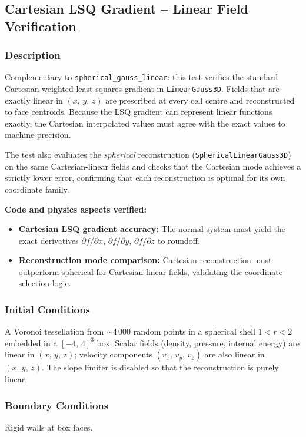 \documentclass[11pt,a4paper]{article}
\begin{document}
\newpage

\subsection{Cartesian LSQ Gradient -- Linear Field Verification}
\label{sec:cartesian_gauss_linear}

\subsubsection*{Description}
Complementary to \texttt{spherical\_gauss\_linear}: this test verifies the standard Cartesian weighted least-squares gradient in \texttt{LinearGauss3D}. Fields that are exactly linear in $(x,\,y,\,z)$ are prescribed at every cell centre and reconstructed to face centroids. Because the LSQ gradient can represent linear functions exactly, the Cartesian interpolated values must agree with the exact values to machine precision.

The test also evaluates the \emph{spherical} reconstruction (\texttt{SphericalLinearGauss3D}) on the same Cartesian-linear fields and checks that the Cartesian mode achieves a strictly lower error, confirming that each reconstruction is optimal for its own coordinate family.

\textbf{Code and physics aspects verified:}
\begin{itemize}
  \item \textbf{Cartesian LSQ gradient accuracy:} The normal system must yield the exact derivatives $\partial f/\partial x$, $\partial f/\partial y$, $\partial f/\partial z$ to roundoff.
  \item \textbf{Reconstruction mode comparison:} Cartesian reconstruction must outperform spherical for Cartesian-linear fields, validating the coordinate-selection logic.
\end{itemize}

\subsubsection*{Initial Conditions}
A Voronoi tessellation from $\sim$4\,000 random points in a spherical shell $1 < r < 2$ embedded in a $[-4,\,4]^3$ box. Scalar fields (density, pressure, internal energy) are linear in $(x,\,y,\,z)$; velocity components $(v_x,\,v_y,\,v_z)$ are also linear in $(x,\,y,\,z)$. The slope limiter is disabled so that the reconstruction is purely linear.

\subsubsection*{Boundary Conditions}
Rigid walls at box faces.
\end{document}
